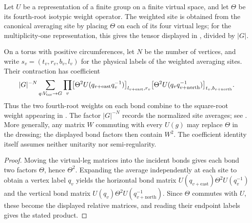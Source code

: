 \begin{definition}%
    \label{def:peps_theta_weighted_averaging_site}
    \leanok
    Let $U$ be a representation of a finite group on a finite virtual space,
    and let $\Theta$ be its fourth-root isotypic weight operator.
    The weighted site is obtained from the canonical averaging site by placing
    $\Theta$ on each of its four virtual legs; for the multiplicity-one
    representation, this gives the tensor displayed in
    \cite[Section~7]{Schuch2010PEPS}, divided by $|G|$.
\end{definition}

\begin{lemma}%
    \label{thm:peps_theta_weighted_torus_bonds}
    \leanok
    On a torus with positive circumferences, let $N$ be the number of vertices,
    and write $s_v=(t_v,r_v,b_v,l_v)$ for the physical labels of the
    weighted averaging sites. Their contraction has coefficient
    \begin{align}
        |G|^{-N}\sum_{q:V_{\rm tor}\to G}\prod_v
        \bigl[\Theta^2U(q_{v+\mathrm{east}}q_v^{-1})\bigr]_
        {l_{v+\mathrm{east}},r_v}
        \bigl[\Theta^2U(q_vq_{v+\mathrm{north}}^{-1})\bigr]_
        {t_v,b_{v+\mathrm{north}}}.
    \end{align}
    Thus the two fourth-root weights on each bond combine to the square-root
    weight appearing in \cite[Section~7]{Schuch2010PEPS}.
    The factor $|G|^{-N}$ records the normalized site averages; see
    \cite{gap:rmp_peps_quantum_double_g_isometry}.
    More generally, any matrix $W$ commuting with every $U(g)$ may replace
    $\Theta$ in the dressing; the displayed bond factors then contain $W^2$.
    The coefficient identity itself assumes neither unitarity nor semi-regularity.
\end{lemma}

\begin{proof}\leanok
    Moving the virtual-leg matrices into the incident bonds gives each bond
    two factors $\Theta$, hence $\Theta^2$.
    Expanding the average independently at each site to obtain a vertex label
    $q_v$ yields the horizontal bond matrix
    $U(q_{v+\mathrm{east}})\Theta^2U(q_v^{-1})$ and the vertical bond matrix
    $U(q_v)\Theta^2U(q_{v+\mathrm{north}}^{-1})$.
    Since $\Theta$ commutes with $U$, these become the displayed relative
    matrices, and reading their endpoint labels gives the stated product.
\end{proof}

